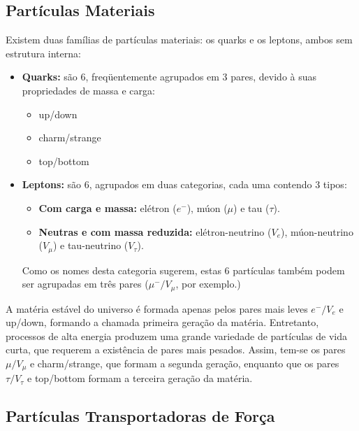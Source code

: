 \subsection{Partículas Materiais}

Existem duas famílias de partículas materiais: os quarks e os leptons, ambos sem estrutura interna:

\begin{itemize}

\item \textbf{Quarks:} são 6, freqüentemente agrupados em 3 pares, devido à suas propriedades de massa e carga:
    \begin{itemize}
        \item up/down
        \item charm/strange
        \item top/bottom
    \end{itemize}

\item \textbf{Leptons:} são 6, agrupados em duas categorias, cada uma contendo 3 tipos:

    \begin{itemize}
        \item \textbf{Com carga e massa:} elétron ($e^-$), múon ($\mu$) e tau
        ($\tau$).

        \item \textbf{Neutras e com massa reduzida:} elétron-neutrino ($V_e$),
múon-neutrino ($V_\mu$) e tau-neutrino ($V_\tau$).

        \end{itemize}

        Como os nomes desta categoria sugerem, estas 6 partículas também podem ser agrupadas em três pares ($\mu^-/V_\mu$, por exemplo.)

\end{itemize}

A matéria estável do universo é formada apenas pelos pares mais leves $e^-/V_e$ e up/down, formando a chamada primeira geração da matéria. Entretanto, processos de alta energia produzem uma grande variedade de partículas de vida curta, que requerem a existência de pares mais pesados. Assim, tem-se os pares $\mu/V_\mu$ e
charm/strange, que formam a segunda geração, enquanto que os pares $\tau/V_\tau$ e top/bottom formam a terceira geração da matéria.

\subsection{Partículas Transportadoras de Força}

